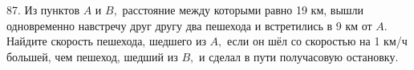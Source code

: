 87. Из пунктов $A$ и $B,$ расстояние между которыми равно 19
км, вышли одновременно навстречу друг другу два
пешехода и встретились в 9 км от $A.$ Найдите скорость
пешехода, шедшего из $A,$ если он шёл со скоростью на
1 км/ч большей, чем пешеход, шедший из $B,$ и сделал в
пути получасовую остановку.\\
